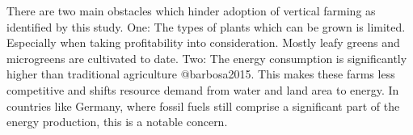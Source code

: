 There are two main obstacles which hinder adoption of vertical farming as identified by this study.
One: The types of plants which can be grown is limited.
Especially when taking profitability into consideration.
Mostly leafy greens and microgreens are cultivated to date. %
Two: The energy consumption is significantly higher than traditional agriculture @barbosa2015.
This makes these farms less competitive and shifts resource demand from water and land area to energy.
In countries like Germany, where fossil fuels still comprise a significant part of the energy production, this is a notable concern.






